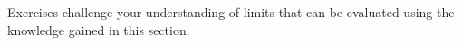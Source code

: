 \begin{exerciseset}{Exercises}{ challenge your understanding of limits that can be evaluated using the knowledge gained in this section.}







\end{exerciseset}
